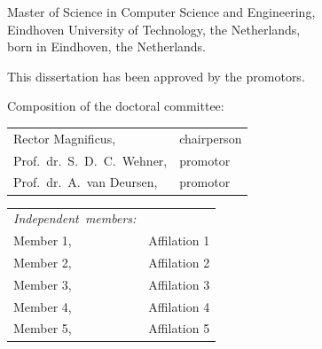 \begin{titlepage}
\begin{center}
\bigskip
\bigskip

Master of Science in Computer Science and Engineering, \\
Eindhoven University of Technology, the Netherlands, \\
born in Eindhoven, the Netherlands.

\vspace*{2\bigskipamount}

\end{center}

\clearpage
\thispagestyle{empty}

\noindent
This dissertation has been approved by the promotors.

\bigskip\noindent
Composition of the doctoral committee:

\medskip\noindent
\begin{tabular}{p{4.5cm}l}
    Rector Magnificus, & chairperson \\
    Prof.\ dr.\ S.\ D.\ C.\ Wehner, & promotor \\
    Prof.\ dr.\ A.\ van Deursen, & promotor \\
\end{tabular}

\medskip\noindent
\begin{tabular}{p{4.5cm}l}
    \mbox{\emph{Independent members:}} & \\
    Member 1,   & Affilation 1 \\
    Member 2,   & Affilation 2 \\
    Member 3,   & Affilation 3 \\
    Member 4,   & Affilation 4 \\
    Member 5,   & Affilation 5 \\
\end{tabular}


\vfill


\end{titlepage}
